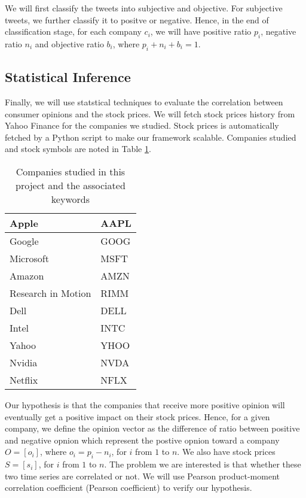 \documentclass[12pt]{article}
\begin{document}
We will first classify the tweets into subjective and objective. For subjective tweets, we further classify it to positve or negative. Hence, in the end of classification stage, for each company $c_i$, we will have positive ratio $p_i$, negative ratio $n_i$ and objective ratio $b_i$, where $p_i + n_i + b_i = 1$.

\subsection{Statistical Inference}\label{statistical-inference}
Finally, we will use statstical techniques to evaluate the correlation between consumer opinions and the stock prices. We will fetch stock prices history from Yahoo Finance for the companies we studied. Stock prices is automatically fetched by a Python script to make our framework scalable. Companies studied and stock symbols are noted in Table \ref{companies-symbols}.

\begin{table}
\begin{center}
    \begin{tabular}{ | l || l | }
        \hline
        Apple &  AAPL \\ \hline
        Google & GOOG \\ \hline
        Microsoft & MSFT \\ \hline
        Amazon & AMZN \\ \hline
        Research in Motion & RIMM \\ \hline
        Dell & DELL \\ \hline
        Intel & INTC \\ \hline
        Yahoo & YHOO \\ \hline
        Nvidia & NVDA \\ \hline
        Netflix & NFLX \\
        \hline
    \end{tabular}
\caption{Companies studied in this project and the associated keywords}
\label{companies-symbols}
\end{center}
\end{table}

Our hypothesis is that the companies that receive more positive opinion will eventually get a positive impact on their stock prices. Hence, for a given company, we define the opinion vector as the difference of ratio between positive and negative opnion which represent the postive opnion toward a company $O = [o_i]$, where $o_i = p_i - n_i$, for $i$ from $1$ to $n$. We also have stock prices $S = [s_i]$, for $i$ from $1$ to $n$. The problem we are interested is that whether these two time series are correlated or not. We will use Pearson product-moment correlation coefficient (Pearson coefficient) to verify our hypothesis.
\end{document}
